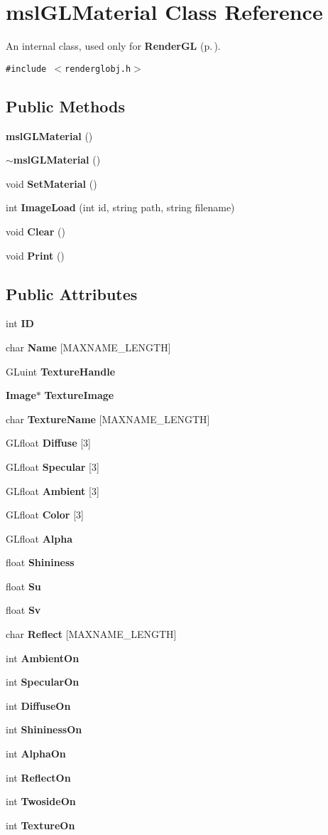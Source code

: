\section{msl\-GLMaterial  Class Reference}
\label{class_mslGLMaterial}
An internal class, used only for {\bf Render\-GL} {\rm (p.\,\pageref{class_RenderGL})}. 


{\tt \#include $<$renderglobj.h$>$}

\subsection*{Public Methods}
\begin{CompactItemize}
\item 
{\bf msl\-GLMaterial} ()
\item 
{\bf $\sim$msl\-GLMaterial} ()
\item 
void {\bf Set\-Material} ()
\item 
int {\bf Image\-Load} (int id, string path, string filename)
\item 
void {\bf Clear} ()
\item 
void {\bf Print} ()
\end{CompactItemize}
\subsection*{Public Attributes}
\begin{CompactItemize}
\item 
int {\bf ID}
\item 
char {\bf Name} [MAXNAME\_\-LENGTH]
\item 
GLuint {\bf Texture\-Handle}
\item 
{\bf Image}$\ast$ {\bf Texture\-Image}
\item 
char {\bf Texture\-Name} [MAXNAME\_\-LENGTH]
\item 
GLfloat {\bf Diffuse} [3]
\item 
GLfloat {\bf Specular} [3]
\item 
GLfloat {\bf Ambient} [3]
\item 
GLfloat {\bf Color} [3]
\item 
GLfloat {\bf Alpha}
\item 
float {\bf Shininess}
\item 
float {\bf Su}
\item 
float {\bf Sv}
\item 
char {\bf Reflect} [MAXNAME\_\-LENGTH]
\item 
int {\bf Ambient\-On}
\item 
int {\bf Specular\-On}
\item 
int {\bf Diffuse\-On}
\item 
int {\bf Shininess\-On}
\item 
int {\bf Alpha\-On}
\item 
int {\bf Reflect\-On}
\item 
int {\bf Twoside\-On}
\item 
int {\bf Texture\-On}
\end{CompactItemize}


